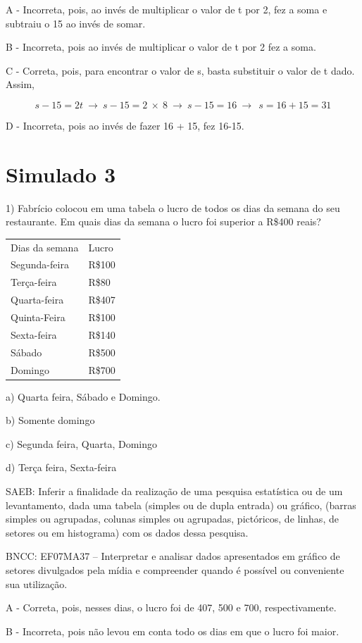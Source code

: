 A - Incorreta, pois, ao invés de multiplicar o valor de t por 2, fez a
soma e subtraiu o 15 ao invés de somar.

B - Incorreta, pois ao invés de multiplicar o valor de t por 2 fez a
soma.

C - Correta, pois, para encontrar o valor de s, basta substituir o valor
de t dado. Assim,

\[s - 15 = 2t\  \rightarrow \ s - 15 = 2\  \times \ 8\  \rightarrow \ s - 15 = 16\  \rightarrow \ \ s = 16 + 15 = 31\]

D - Incorreta, pois ao invés de fazer 16 + 15, fez 16-15.

\hypertarget{simulado-3}{%
\section{Simulado 3}\label{simulado-3}}

1) Fabrício colocou em uma tabela o lucro de todos os dias da semana do
seu restaurante. Em quais dias da semana o lucro foi superior a R\$400
reais?

\begin{longtable}[]{@{}ll@{}}
\toprule
\endhead
Dias da semana & Lucro\tabularnewline
Segunda-feira & R\$100\tabularnewline
Terça-feira & R\$80\tabularnewline
Quarta-feira & R\$407\tabularnewline
Quinta-Feira & R\$100\tabularnewline
Sexta-feira & R\$140\tabularnewline
Sábado & R\$500\tabularnewline
Domingo & R\$700\tabularnewline
\bottomrule
\end{longtable}

a) Quarta feira, Sábado e Domingo.

b) Somente domingo

c) Segunda feira, Quarta, Domingo

d) Terça feira, Sexta-feira

SAEB: Inferir a finalidade da realização de uma pesquisa estatística ou
de um levantamento, dada uma tabela (simples ou de dupla entrada) ou
gráfico, (barras simples ou agrupadas, colunas simples ou agrupadas,
pictóricos, de linhas, de setores ou em histograma) com os dados dessa
pesquisa.~

BNCC: EF07MA37 -- Interpretar e analisar dados apresentados em gráfico
de setores divulgados pela mídia e compreender quando é possível ou
conveniente sua utilização.

A - Correta, pois, nesses dias, o lucro foi de 407, 500 e 700,
respectivamente.

B - Incorreta, pois não levou em conta todo os dias em que o lucro foi
maior.

